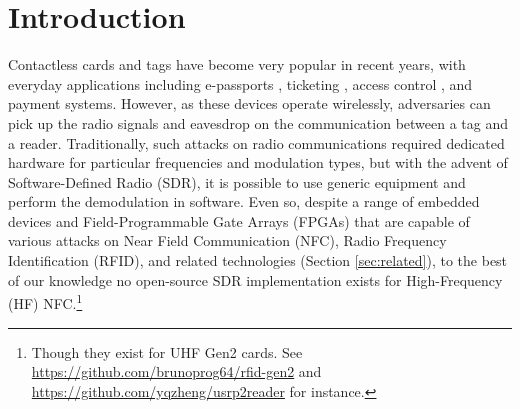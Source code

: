 \documentclass[fleqn,10pt]{SelfArx} %
\affiliation{\textsuperscript{1}\textit{CDT in Cyber Security, University of Oxford, Oxford, United Kingdom}} %
\begin{document}

\flushbottom %

\maketitle %


\thispagestyle{empty} %


\section{Introduction}
\label{sec:introduction}

Contactless cards and tags have become very popular in recent years, with everyday applications including e-passports \cite{epassports}, ticketing \cite{mbta, chipkaart, classicvulnerabilities}, access control \cite{imperial}, and payment \cite{relay, practicalrelay} systems. However, as these devices operate wirelessly, adversaries can pick up the radio signals and eavesdrop on the communication between a tag and a reader. Traditionally, such attacks on radio communications required dedicated hardware for particular frequencies and modulation types, but with the advent of Software-Defined Radio (SDR), it is possible to use generic equipment and perform the demodulation in software. Even so, despite a range of embedded devices and Field-Programmable Gate Arrays (FPGAs) that are capable of various attacks on Near Field Communication (NFC), Radio Frequency Identification (RFID), and related technologies  (Section \ref{sec:related}), to the best of our knowledge no open-source SDR implementation exists for High-Frequency (HF) NFC.\footnote{Though they exist for UHF Gen2 cards. See \url{https://github.com/brunoprog64/rfid-gen2} and \url{https://github.com/yqzheng/usrp2reader} for instance.} 
\end{document}
